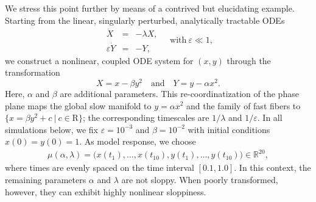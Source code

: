 \documentclass{article}
\newcommand{\eps}{\varepsilon}
\newcommand{\omr}{\mu}
\newcommand{\R}{\mathrm{R}}
\newcommand{\be}{\begin{equation}}
\newcommand{\ee}{\end{equation}}
\begin{document}
We stress this point further by means of a contrived but elucidating example.
Starting from the linear, singularly perturbed, analytically tractable ODEs
%
\be
\begin{array}{rcl}
 \dot{X} &=& -\lambda X ,
\\
 \eps \dot{Y} &=& - Y ,
\end{array}
\quad\mbox{with}\ \eps \ll 1 ,
\label{XY-system}
\ee
%
we construct a nonlinear, coupled ODE system for $(x,y)$ through the transformation
%
\[
 X = x - \beta y^2
\quad\mbox{and}\quad
 Y = y - \alpha x^2 .
\]
%
Here, $\alpha$ and $\beta$ are additional parameters.
This re-coordinatization of the phase plane maps the global slow manifold to $y=\alpha x^2$ and the family of fast fibers to $\{x=\beta y^2 +c \ \vert \ c\in \R\}$; the corresponding timescales are $1/\lambda$ and $1/\eps$.
In all simulations below, we fix $\eps = 10^{-3}$ and $\beta = 10^{-2}$ with initial conditions $x(0) = y(0) = 1$.
As model response, we choose
%
\begin{align}
 \omr(\alpha, \lambda)
=
\big(
 x(t_1) , \ldots , x(t_{10}) , y(t_1) , \ldots , y(t_{10})
\big)
\in
 \mathbb{R}^{20} ,
\label{eq:henon-mr}
\end{align}
%
where times are evenly spaced on the time interval $[0.1, 1.0]$.
In this context, the remaining parameters $\alpha$ and $\lambda$ are not sloppy.
When poorly transformed, however, they can exhibit highly nonlinear sloppiness.\\
\end{document}
